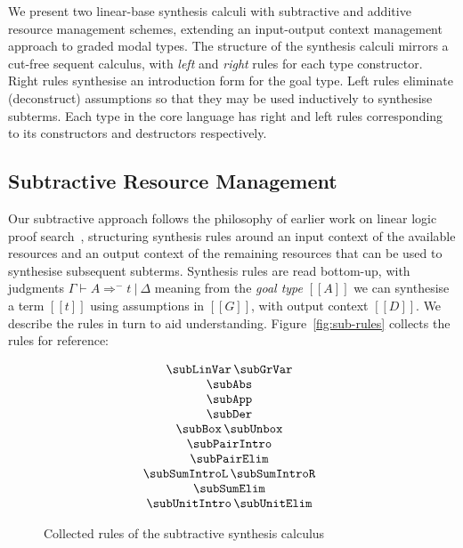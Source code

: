 We present two linear-base synthesis calculi with subtractive and additive resource
management schemes, extending an input-output context management approach to graded
modal types. The structure of the synthesis calculi mirrors a
cut-free sequent calculus, with
\textit{left} and \textit{right} rules for each type constructor. Right rules
synthesise an introduction form for the goal type. Left rules
eliminate (deconstruct) assumptions so that they may be
used inductively to synthesise subterms. Each type in the
core language has right and left
rules corresponding to its constructors and destructors respectively.


\subsection{Subtractive Resource Management}
  Our subtractive approach follows the philosophy of earlier work on
  linear logic proof search~\cite{HODAS1994327,CERVESATO2000133},
  structuring synthesis rules around an input context of the available
  resources and an output context of the remaining resources that
  can be used to synthesise subsequent subterms. Synthesis rules
  are read bottom-up, with judgments $\Gamma \vdash A \Rightarrow^{-} t\ |\ \Delta$
  meaning from the \emph{goal type} $[[A]]$ we can synthesise a term $[[t]]$ using
  assumptions in $[[G]]$, with output context $[[D]]$. We describe
  the rules in turn to aid understanding. Figure~\ref{fig:sub-rules} collects the
  rules for reference:

\begin{figure}[H]
\begin{align*}
\hspace{-0.5em}
  \begin{array}{c}
    \subLinVar
    \,
    \subGrVar
    \\
    \subAbs
    \\
    \subApp
    \\
    \subDer
    \\
    \subBox
    \,
    \subUnbox
    \\
    \subPairIntro
    \\
    \subPairElim
    \\
    \subSumIntroL
    \,
    \subSumIntroR
    \\
    \subSumElim
    \\
    \subUnitIntro
    \,
    \subUnitElim
  \end{array}
\end{align*}
\caption{Collected rules of the subtractive synthesis calculus}
  \end{figure}


